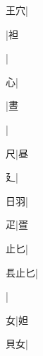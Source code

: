 \begin{multicols}{2}
{{\cjk{}{\cnsym{}　}王穴}|{}\par
{}|{\cjk{}袒}\par
{}|{}\par
{心}|{}\par
{}|{\cjk{}晝}\par
{}|{}\par
{\cjk{}{\cnsym{}　}{\cnsym{}　}尺}|{\cjk{}昼}\par
{廴}|{}\par
{\cjk{}{\cnsym{}　}日羽}|{}\par
{\cjk{}{\cnsym{}　}{\cnsym{}　}疋}|{\cjk{}疍}\par
{\cjk{}{\cnsym{}　}止匕}|{}\par
{\cjk{}镸止匕}|{}\par
{}|{}\par
{\cjk{}{\cnsym{}　}{\cnsym{}　}女}|{\cjk{}妲}\par
{\cjk{}{\cnsym{}　}貝女}|{}\par
}
\end{multicols}
